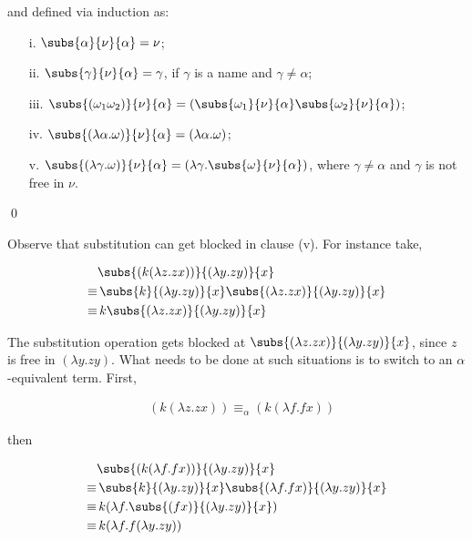 \documentclass[11pt]{article}
\begin{document}
and defined via induction as:

\begin{udefinition}[Substitution]

\begin{itemize}
\item[]
\item[i.] $\subs{\alpha}{\nu}{\alpha}= \nu$;
\item[ii.] $\subs{\gamma}{\nu}{\alpha}= \gamma$, if $\gamma$ is a name and $\gamma\neq\alpha$;
\item[iii.] $\subs{(\omega_1\omega_2)}{\nu}{\alpha}= (\subs{\omega_1}{\nu}{\alpha}\subs{\omega_2}{\nu}{\alpha})$;
\item[iv.] $\subs{(\lambda \alpha.\omega)}{\nu}{\alpha}= (\lambda \alpha.\omega)$;
\item[v.] $\subs{(\lambda \gamma.\omega)}{\nu}{\alpha} = (\lambda \gamma.\subs{\omega}{\nu}{\alpha})$, where $\gamma\neq\alpha$ and $\gamma$ is not free in $\nu$.

\end{itemize}

\qed
\end{udefinition}

Observe that substitution can get blocked in clause (v). For instance take,

\begin{align}
& \subs{(k(\lambda z.zx))}{(\lambda y.zy)}{x}\\
 \equiv & \, \subs{k}{(\lambda y.zy)}{x}\subs{(\lambda z.zx)}{(\lambda y.zy)}{x}  \nonumber\\
 \equiv & \, k \subs{(\lambda z.zx)}{(\lambda y.zy)}{x} \nonumber
\end{align}

The substitution operation gets blocked at $\subs{(\lambda z.zx)}{(\lambda y.zy)}{x}$, since $z$ is free in $(\lambda y.zy)$. What needs to be done at such situations is to switch to an $\alpha$-equivalent term. First, 

\begin{align}
& (k(\lambda z.zx)) \equiv_\alpha (k(\lambda f.fx)) 
\end{align}

then

\begin{align}
& \subs{(k(\lambda f.fx))}{(\lambda y.zy)}{x}\\
 \equiv & \, \subs{k}{(\lambda y.zy)}{x}\subs{(\lambda f.fx)}{(\lambda y.zy)}{x}  \nonumber\\
 \equiv & \, k (\lambda f.\subs{(fx)}{(\lambda y.zy)}{x}) \nonumber\\
 \equiv & \, k (\lambda f.f(\lambda y.zy))\nonumber
\end{align}
\end{document}
